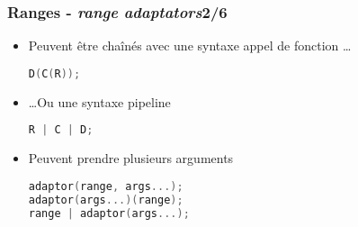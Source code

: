 \documentclass[C++.tex]{subfiles}
\begin{document}
\begin{frame}[fragile]
	\frametitle{Ranges - \textit{range adaptators}\titlehfill{}2/6}
	\begin{itemize}
		\item Peuvent être chaînés avec une syntaxe \og appel de fonction\fg{} \ldots

		\begin{lstlisting}[language=C++]
D(C(R));\end{lstlisting}
		
		\item \ldots Ou une syntaxe \og pipeline\fg{}

		\begin{lstlisting}[language=C++]
R | C | D;\end{lstlisting}

		\item Peuvent prendre plusieurs arguments


		\begin{lstlisting}[language=C++]
adaptor(range, args...);
adaptor(args...)(range);
range | adaptor(args...);\end{lstlisting}

	\end{itemize}
\end{frame}
\end{document}
